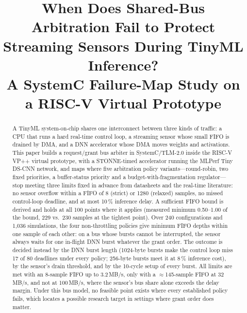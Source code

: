 \documentclass[conference]{IEEEtran}
\begin{document}
\title{When Does Shared-Bus Arbitration Fail to Protect Streaming Sensors During TinyML Inference?\\
\large A SystemC Failure-Map Study on a RISC-V Virtual Prototype}

\author{
}

\maketitle

\begin{abstract}
A TinyML system-on-chip shares one interconnect between three kinds of traffic: a CPU that runs a hard real-time control loop, a streaming sensor whose small FIFO is drained by DMA, and a DNN accelerator whose DMA moves weights and activations. This paper builds a request/grant bus arbiter in SystemC/TLM-2.0 inside the RISC-V VP++ virtual prototype, with a STONNE-timed accelerator running the MLPerf Tiny DS-CNN network, and maps where five arbitration policy variants---round-robin, two fixed priorities, a buffer-status priority and a budget-with-fragmentation regulator---stop meeting three limits fixed in advance from datasheets and the real-time literature: no sensor overflow within a FIFO of 8 (strict) or 1280 (relaxed) samples, no missed control-loop deadline, and at most 10\,\% inference delay. A sufficient FIFO bound is derived and holds at all 100 points where it applies (measured minimum 0.50--1.00 of the bound, 229 vs.\ 230 samples at the tightest point). Over 240 configurations and 1{,}036 simulations, the four non-throttling policies give minimum FIFO depths within one sample of each other: on a bus whose bursts cannot be interrupted, the sensor always waits for one in-flight DNN burst whatever the grant order. The outcome is decided instead by the DNN burst length (1024-byte bursts make the control loop miss 17 of 80 deadlines under every policy; 256-byte bursts meet it at 8\,\% inference cost), by the sensor's drain threshold, and by the 10-cycle setup of every burst. All limits are met with an 8-sample FIFO up to 3.2\,MB/s, only with a $\approx$145-sample FIFO at 32\,MB/s, and not at 100\,MB/s, where the sensor's bus share alone exceeds the delay margin. Under this bus model, no feasible point exists where every established policy fails, which locates a possible research target in settings where grant order does matter.
\end{abstract}
\end{document}
